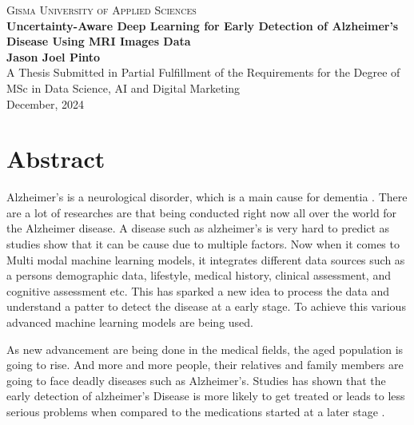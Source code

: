 \documentclass[12pt,onecolumn]{report}
\begin{document}
\begin{titlepage}
    \begin{center}
        
        \textsc{\Large Gisma University of Applied Sciences} \\[1.5cm]
        \vfill  
        {\bfseries\Huge Uncertainty-Aware Deep Learning for Early Detection of Alzheimer’s Disease Using MRI Images Data \\[0.4cm]}
        \vfill        
        {\Large \textbf{Jason Joel Pinto}} \\[2cm]
        \vfill
        {\large A Thesis Submitted in Partial Fulfillment of the Requirements for the Degree of} \\[0.5cm]
        {\Large MSc in Data Science, AI and Digital Marketing} \\[1.5cm]
        
        {\large December, 2024}
        
        \vfill
    \end{center}
\end{titlepage}

\chapter*{Abstract}

Alzheimer's is a neurological disorder, which is a main cause for dementia \cite{Ewers2011}. There are a lot of researches are that being conducted right now all over the world for the Alzheimer disease. A disease such as alzheimer's is very hard to predict as studies show that it can be cause due to multiple factors. Now when it comes to Multi modal machine learning models, it integrates different data sources such as a persons demographic data, lifestyle, medical history, clinical assessment, and cognitive assessment etc. This has sparked a new idea to process the data and understand a patter to detect the disease at a early stage. To achieve this various advanced machine learning models are being used.

As new advancement are being done in the medical fields, the aged population is going to rise. And more and more people, their relatives and family members are going to face deadly diseases such as Alzheimer's. Studies has shown that the early detection of alzheimer's Disease is more likely to get treated or leads to less serious problems when compared to the medications started at a later stage \cite{Cummings2024}.
\end{document}
